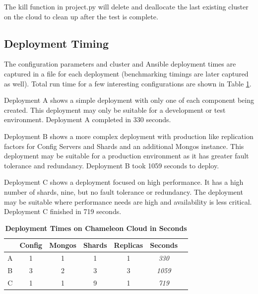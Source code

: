 \documentclass[9pt,twocolumn,twoside]{../../styles/osajnl}
\begin{document}
The kill function in project.py will delete and deallocate the last existing cluster on the cloud to clean up after the test is complete.


\subsection{Deployment Timing}

The configuration parameters and cluster and Ansible deployment times are captured in a file for each deployment (benchmarking timings are later captured as well).  Total run time for a few interesting configurations are shown in Table \ref{tab:deploy-times}.  

Deployment A shows a simple deployment with only one of each component being created.  This deployment may only be suitable for a development or test environment.  Deployment A completed in 330 seconds.

Deployment B shows a more complex deployment with production like replication factors for Config Servers and Shards and an additional Mongos instance.  This deployment may be suitable for a production environment as it has greater fault tolerance and redundancy.  Deployment B took 1059 seconds to deploy.

Deployment C shows a deployment focused on high performance.  It has a high number of shards, nine, but no fault tolerance or redundancy.  The deployment may be suitable where performance needs are high and availability is less critical.  Deployment C finished in 719 seconds.


\begin{table}[htbp]
\centering
\caption{\bf Deployment Times on Chameleon Cloud in Seconds}

  \begin{tabular}{| c | c | c | c | c | c | c |} 
 \hline
 & Config &  Mongos & Shards & Replicas & Seconds \\

 
 \hline
 A & 1 & 1 & 1 & 1 & \emph{330} \\
 \hline
 B & 3 & 2 & 3 & 3 & \emph{1059} \\
 \hline
 C & 1 & 1 & 9 & 1 & \emph{719} \\ [1ex] 
 \hline


\end{tabular}
  \label{tab:deploy-times}
\end{table}
\end{document}
